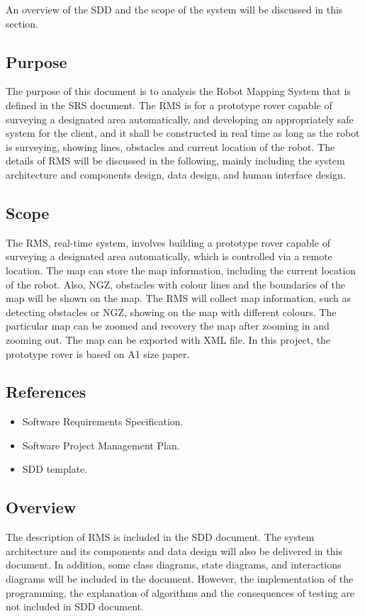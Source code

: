 An overview of the SDD and the scope of the system will be discussed in this section.

\subsection{Purpose}
The purpose of this document is to analysis the Robot Mapping System that is defined in the SRS document. The RMS is for a prototype rover capable of surveying a designated area automatically, and developing an appropriately safe system for the client, and it shall be constructed  in real time as long as the robot is surveying, showing lines, obstacles and current location of the robot. The details of RMS will be discussed in the following, mainly including the system architecture and components design, data design, and human interface design.

\subsection{Scope}
The RMS, real-time system, involves building a prototype rover capable of surveying a designated area automatically, which is controlled via a remote location. The map can store the map information, including the current location of the robot. Also, NGZ, obstacles with colour lines and the boundaries of the map will be shown on the map.  The RMS will collect map information, such as detecting obstacles or NGZ, showing on the map with different colours. The particular map can be zoomed and recovery the map after zooming in and zooming out.  The map can be exported with XML file.
In this project, the prototype rover is based on A1 size paper.


\subsection{References}
\begin{itemize}
	\item Software Requirements Specification.
	\item Software Project Management Plan.
	\item SDD template.
\end{itemize}	

\subsection{Overview}
The description of RMS is included in the SDD document. The system architecture and its components and data design will also be delivered in this document. In addition, some class diagrams, state diagrams, and interactions diagrams will be included in the document. However, the implementation of the programming, the explanation of algorithms and the consequences of testing are not included in SDD document. 

